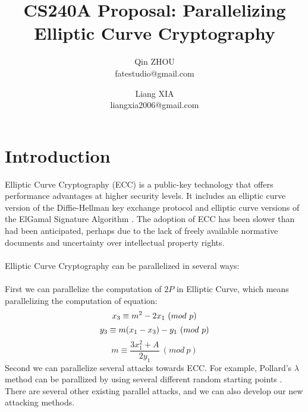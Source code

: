 \documentclass[10pt,a4paper]{article}
\author{Qin ZHOU \\
    fatestudio@gmail.com
    \and
    Liang XIA \\
    liangxia2006@gmail.com
    }
\title{CS240A Proposal: Parallelizing Elliptic Curve Cryptography}
\begin{document}
\maketitle
\section{Introduction}
\indent Elliptic Curve Cryptography (ECC) is a public-key technology
that offers performance advantages at
   higher security levels.  It includes an elliptic curve version of the
   Diffie-Hellman key exchange protocol \cite{DH1976} and elliptic curve
   versions of the ElGamal Signature Algorithm \cite{E1985}.  The adoption of
   ECC has been slower than had been anticipated, perhaps due to the
   lack of freely available normative documents and uncertainty over
   intellectual property rights. \cite{RFC6090} \\ \\
Elliptic Curve Cryptography can be parallelized in several ways: \\ \\
First we can parallelize the computation of $2P$ in Elliptic Curve, which means parallelizing the computation of equation:
\begin{equation}
x_3 \equiv m^2 - 2x_1\ (mod\ p) \\
\end{equation}
\begin{equation}
y_3 \equiv m(x_1 - x_3) - y_1\ (mod\ p) \\
\end{equation}
\begin{equation}
m \equiv \frac{3x_1^2 + A}{2y_1}\ (mod\ p)
\end{equation}
Second we can parallelize several attacks towards ECC. For example, Pollard's $\lambda$ method can be parallized by using several different random starting points \cite{ECC Book}. There are several other existing parallel attacks, and we can also develop our new attacking methods. \\
\end{document}
